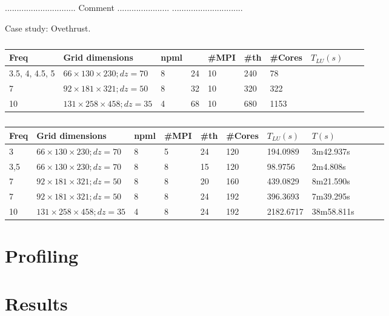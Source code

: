 .............................. \newline
Comment ......................
.............................. \newline

Case study: Ovethrust. \newline

\begin{table}[!h]
\centering

\label{amestoy}
\begin{tabular}{llllllllll}
Freq & Grid dimensions & npml &  & \#MPI & \#th & \#Cores & $T_{LU}(s)$  \\
 \hline
3.5, 4, 4.5, 5 & $ 66 \times 130 \times 230; dz=70$ & 8 & 24 & 10 & 240 & 78 \\
7 &	$ 92 \times 181 \times 321; dz=50 $ &	8 & 32 & 10	& 320 & 322 \\
10 & $ 131 \times 258 \times 458; dz=35$ &	4 &	68 & 10	& 680 &	1153

\end{tabular}
\caption{}
\end{table}

\begin{table}[!h]
\centering

\label{amestoyMesca}
\begin{tabular}{lllllllllll}
Freq & Grid dimensions & npml & \#MPI & \#th & \#Cores & $T_{LU}(s)$ & $ T(s)$ \\
 \hline
3	& $ 66 \times 130 \times 230; dz=70$ &	8 & 5 & 24	& 120 &	194.0989 & 3m42.937s  \\
3,5	& $ 66 \times 130 \times 230; dz=70$ &	8 &	8 &	15 &	120 &	98.9756 & 2m4.808s  \\
7	& $ 92 \times 181 \times 321; dz=50 $ & 8 & 8 & 20 &	160	& 439.0829 & 8m21.590s  \\
7	& $ 92\times 181 \times 321; dz=50 $ &	8 &	8 &	24 &	192	& 396.3693 & 7m39.295s	 \\							
10	& $ 131 \times 258 \times 458; dz=35$ &	4	& 8 &	24 & 192	 & 2182.6717 &	38m58.811s
\end{tabular}
\caption{}
\end{table}
\section{Profiling}
\section{Results}